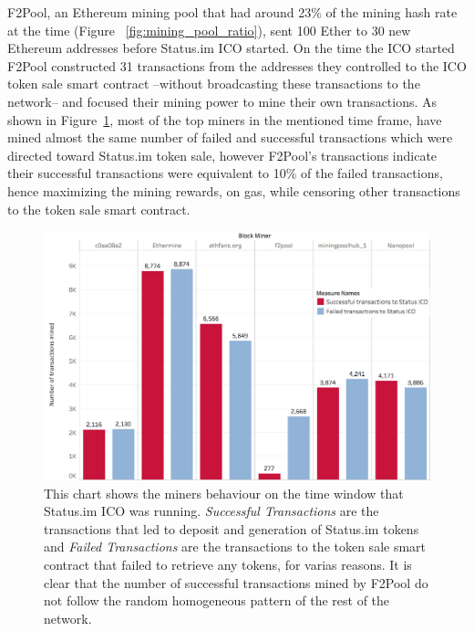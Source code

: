F2Pool, an Ethereum mining pool that had around 23\% of the mining hash rate at the time (Figure ~\ref{fig:mining_pool_ratio}), sent 100 Ether to 30 new Ethereum addresses before Status.im ICO started. On the time the ICO started F2Pool constructed 31 transactions from the addresses they controlled to the ICO token sale smart contract --without broadcasting these transactions to the network-- and focused their mining power to mine their own transactions.
As shown in Figure~\ref{fig:Transactions_miners_while_status_ico_cut}, most of the top miners in the mentioned time frame, have mined almost the same number of failed and successful transactions which were directed toward Status.im token sale, however F2Pool's transactions indicate their successful transactions were equivalent to 10\% of the failed transactions, hence maximizing the mining rewards, on gas, while censoring other transactions to the token sale smart contract.


\begin{figure}[h]
\centering
\includegraphics[width=0.7\linewidth]{figures/Transactions_miners_while_status_ico_cut_only_icotx.png}
\caption{This chart shows the miners behaviour on the time window that Status.im ICO was running. \textit{Successful Transactions} are the transactions that led to deposit and generation of Status.im tokens and \textit{Failed Transactions} are the transactions to the token sale smart contract that failed to retrieve any tokens, for varias reasons.  It is clear that the number of successful transactions mined by F2Pool do not follow the random homogeneous pattern of the rest of the network. \label{fig:Transactions_miners_while_status_ico_cut}} 
\end{figure}


